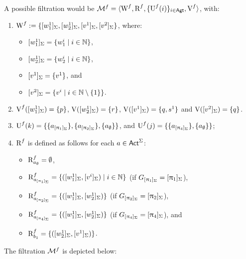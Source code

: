 \begin{example}
A possible filtration would be $\mathcal{M}^f = \langle \operatorname{W}^f,\operatorname{R}^f, \{ \operatorname{U}^f(i) \}_{i\in {\rm \sf Agt}}, \operatorname{V}^f \rangle$, with: 
\begin{enumerate}
\item $\operatorname{W}^f := \{ [w^1_1]_\Sigma,[w^1_2]_\Sigma,[v^1]_\Sigma,[v^2]_\Sigma \}$, where:
    \begin{itemize}
        \item $[w^1_1]_\Sigma=\{ w^i_1 \mid i \in \mathbb{N} \}$,
        \item $[w^1_2]_\Sigma=\{ w^i_2 \mid i \in \mathbb{N} \}$, 
        \item $[v^1]_\Sigma=\{ v^1 \}$, 
        and 
        \item $[v^2]_\Sigma=\{ v^i \mid i \in \mathbb{N} \setminus \{ 1 \} \}$.
    \end{itemize}
\item $\operatorname{V}^f([w^1_1]_\Sigma) = \{ p \}$, $\operatorname{V}([w^1_2]_\Sigma) = \{ r \}$, $\operatorname{V}([v^1]_\Sigma) = \{ q,s^1 \}$ and $\operatorname{V}([v^2]_\Sigma) = \{ q \}$.
\item
$\operatorname{U}^f(k) = \{ \{ a_{[\uppi_1]_\Sigma} \}, \{ a_{[\uppi_2]_\Sigma} \}, \{ a_\emptyset \} \}$, and 
$\operatorname{U}^f(j) = \{ \{ a_{[\uppi_4]_\Sigma} \}, \{ a_\emptyset \} \}$;
\item $\operatorname{R}^f$ is defined as follows for each $a \in {\rm \sf Act}^\Sigma$:
\begin{itemize}
\item $\operatorname{R}^f_{a_\emptyset} = \emptyset$,
\item $\operatorname{R}^f_{a_{[\uppi_1]_\Sigma}} = \{ ([w^1_1]_\Sigma,[v^i]_\Sigma) \mid i \in \mathbb{N} \}$ (if $G_{[\uppi_1]_\Sigma} = [\uppi_1]_\Sigma$),
\item $\operatorname{R}^f_{a_{[\uppi_2]_\Sigma}} = \{ ([w^1_1]_\Sigma,[w^1_2]_\Sigma) \}$ (if $G_{[\uppi_2]_\Sigma} = [\uppi_2]_\Sigma$),
\item $\operatorname{R}^f_{a_{[\uppi_4]_\Sigma}} = \{ ([w^1_1]_\Sigma,[w^1_2]_\Sigma) \}$ (if $G_{[\uppi_4]_\Sigma} = [\uppi_4]_\Sigma$), and 
\item $\operatorname{R}^f_{b_1} = \{ ([w^1_2]_\Sigma,[v^1]_\Sigma) \}$. %
\end{itemize}
\end{enumerate}

\medskip

The filtration $\mathcal{M}^f$ is depicted below:

\begin{center}
\end{center}
\end{example}
